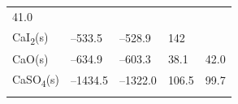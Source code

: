 \documentclass[
  9pt,
]{extbook}
\theoremstyle{definition}
\theoremstyle{definition}
\theoremstyle{definition}
\theoremstyle{remark}
\begin{document}
\begin{longtable}[]{@{}lllll@{}}
\begin{minipage}[t]{0.18\columnwidth}
41.0\strut
\end{minipage}\tabularnewline
\begin{minipage}[t]{0.10\columnwidth}\raggedright
CaI\textsubscript{2}(s)\strut
\end{minipage} & \begin{minipage}[t]{0.19\columnwidth}\raggedright
--533.5\strut
\end{minipage} & \begin{minipage}[t]{0.20\columnwidth}\raggedright
--528.9\strut
\end{minipage} & \begin{minipage}[t]{0.18\columnwidth}\raggedright
142\strut
\end{minipage} & \begin{minipage}[t]{0.18\columnwidth}\raggedright
\strut
\end{minipage}\tabularnewline
\begin{minipage}[t]{0.10\columnwidth}\raggedright
CaO(s)\strut
\end{minipage} & \begin{minipage}[t]{0.19\columnwidth}\raggedright
--634.9\strut
\end{minipage} & \begin{minipage}[t]{0.20\columnwidth}\raggedright
--603.3\strut
\end{minipage} & \begin{minipage}[t]{0.18\columnwidth}\raggedright
38.1\strut
\end{minipage} & \begin{minipage}[t]{0.18\columnwidth}\raggedright
42.0\strut
\end{minipage}\tabularnewline
\begin{minipage}[t]{0.10\columnwidth}\raggedright
CaSO\textsubscript{4}(s)\strut
\end{minipage} & \begin{minipage}[t]{0.19\columnwidth}\raggedright
--1434.5\strut
\end{minipage} & \begin{minipage}[t]{0.20\columnwidth}\raggedright
--1322.0\strut
\end{minipage} & \begin{minipage}[t]{0.18\columnwidth}\raggedright
106.5\strut
\end{minipage} & \begin{minipage}[t]{0.18\columnwidth}\raggedright
99.7\strut
\end{minipage}\tabularnewline
\begin{minipage}[t]{0.10\columnwidth}\raggedright

\end{minipage}
\end{longtable}
\end{document}
